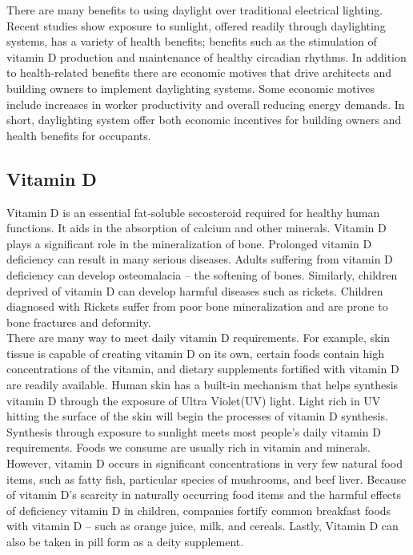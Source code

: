  There are many benefits to using daylight over traditional electrical lighting.
  Recent studies show exposure to sunlight, offered readily through daylighting systems, has a variety of health benefits; benefits such as the stimulation of vitamin D production and maintenance of healthy circadian rhythms.
  In addition to health-related benefits there are economic motives that drive architects and building owners to implement daylighting systems.
  Some economic motives include increases in worker productivity and overall reducing energy demands.
  In short, daylighting system offer both economic incentives for building owners and health benefits for occupants.

  \subsection{Vitamin D}
    Vitamin D is an essential fat-soluble secosteroid required for healthy human functions. It aids in the absorption of calcium and other minerals. Vitamin D plays a significant role in the mineralization of bone\cite{Ross}.   
    Prolonged vitamin D deficiency can result in many serious diseases.
    Adults suffering from vitamin D deficiency can develop osteomalacia -- the softening of bones. Similarly, children deprived of vitamin D can develop harmful diseases such as rickets. Children diagnosed with Rickets suffer from poor bone mineralization and are prone to bone fractures and deformity\cite{Pettifor}. \\

    There are many way to meet daily vitamin D requirements. For example, skin tissue is capable of creating vitamin D on its own, certain foods contain high concentrations of the vitamin, and dietary supplements fortified with vitamin D are readily available\cite{Ross}.
    Human skin has a built-in mechanism that helps synthesis vitamin D through the exposure of Ultra Violet(UV) light. Light rich in UV hitting the surface of the skin will begin the processes of vitamin D synthesis. Synthesis through exposure to sunlight meets most people's daily vitamin D requirements. Foods we consume are usually rich in vitamin and minerals. However, vitamin D occurs in significant concentrations in very few natural food items, such as fatty fish, particular species of mushrooms, and beef liver.  Because of vitamin D's scarcity in naturally occurring food items and the harmful effects of deficiency vitamin D  in children, companies fortify common breakfast foods with vitamin D -- such as orange juice, milk, and cereals. Lastly, Vitamin D can also be taken in pill form as a deity supplement. \\

